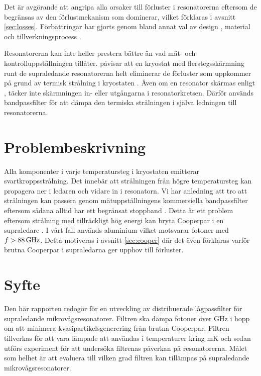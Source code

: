\documentclass[main.tex]{subfiles}
\begin{document}
Det är avgörande att angripa alla orsaker till förluster i resonatorerna eftersom de begränsas av den förlustmekanism som dominerar, vilket förklaras i avsnitt \ref{sec:losses}. Förbättringar har gjorts genom bland annat val av design \cite{khalil2011,chiaro2016}, material \cite{Goetz2016} och tillverkningsprocess \cite{Bruno2015,Sanberg2012}.

Resonatorerna kan inte heller prestera bättre än vad mät- och kontrolluppställningen tillåter. \citeauthor{Barends2011} påvisar att en kryostat med flerstegsskärmning runt de supraledande resonatorerna helt eliminerar de förluster som uppkommer på grund av termisk strålning i kryostaten \cite{Barends2011}. Även om en resonator skärmas enligt \cite{Barends2011}, täcker inte skärmningen in- eller utgångarna i resonatorkretsen. Därför används bandpassfilter för att dämpa den termiska strålningen i själva ledningen till resonatorerna.

\section{Problembeskrivning}


Alla komponenter i varje temperatursteg i kryostaten emitterar svartkroppsstrålning. Det innebär att strålningen från högre temperatursteg kan propagera ner i ledaren och vidare in i resonatorn. Vi har anledning att tro att strålningen kan passera genom mätuppställningens kommersiella bandpassfilter eftersom sådana alltid har ett begränsat stoppband \cite{santavicca2008}. Detta är ett problem eftersom strålning med tillräckligt hög energi kan bryta Cooperpar i en supraledare \cite{Gao2008}. I vårt fall används aluminium vilket motsvarar fotoner med $f>\unit[88]{GHz}$. Detta motiveras i avsnitt \ref{sec:cooper} där det även förklaras varför brutna Cooperpar i supraledarna ger upphov till förluster.

\section{Syfte}
Den här rapporten redogör för en utveckling av distribuerade lågpassfilter för supraledande mikrovågsresonatorer. Filtren ska dämpa fotoner över \unit[88]{GHz} i hopp om att minimera kvasipartikelsgenerering från brutna Cooperpar. Filtren tillverkas för att vara lämpade att användas i temperaturer kring \unit[10]{mK} och sedan utförs experiment för att undersöka filtrenas påverkan på resonatorerna. Målet som helhet är att evaluera till vilken grad filtren kan tillämpas på supraledande mikrovågsresonatorer.
\end{document}
